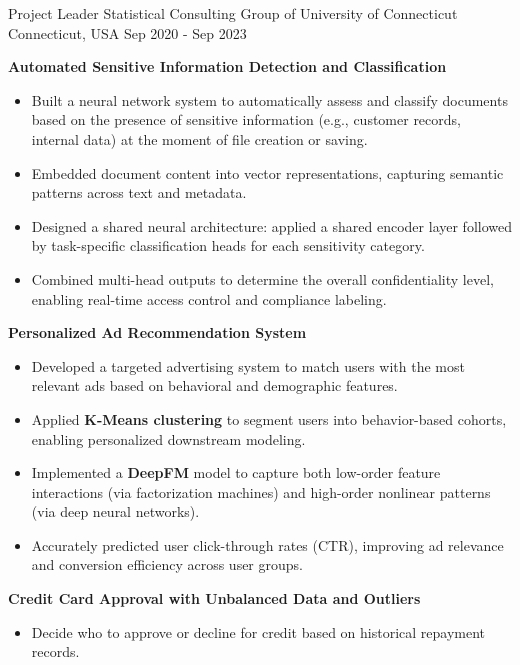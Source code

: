 \begin{cventries}
  
  \cventry
    {Project Leader} %
    {Statistical Consulting Group of University of Connecticut} %
    {Connecticut, USA} %
    {Sep 2020 - Sep 2023} %
    {
      \begin{cvitems}
        \item \textbf{Automated Sensitive Information Detection and Classification}
        \begin{itemize}
          \item Built a neural network system to automatically assess and classify documents based on the presence of sensitive information (e.g., customer records, internal data) at the moment of file creation or saving.
          \item Embedded document content into vector representations, capturing semantic patterns across text and metadata.
          \item Designed a shared neural architecture: applied a shared encoder layer followed by task-specific classification heads for each sensitivity category.
          \item Combined multi-head outputs to determine the overall confidentiality level, enabling real-time access control and compliance labeling.
        \end{itemize}
        \item \textbf{Personalized Ad Recommendation System}
        \begin{itemize}
          \item Developed a targeted advertising system to match users with the most relevant ads based on behavioral and demographic features.
          \item Applied \textbf{K-Means clustering} to segment users into behavior-based cohorts, enabling personalized downstream modeling.
          \item Implemented a \textbf{DeepFM} model to capture both low-order feature interactions (via factorization machines) and high-order nonlinear patterns (via deep neural networks).
          \item Accurately predicted user click-through rates (CTR), improving ad relevance and conversion efficiency across user groups.
        \end{itemize}
        \item \textbf{Credit Card Approval with Unbalanced Data and Outliers}
        \begin{itemize}
          \item Decide who to approve or decline for credit based on historical repayment records.

\end{itemize}
\end{cvitems}}
\end{cventries}
